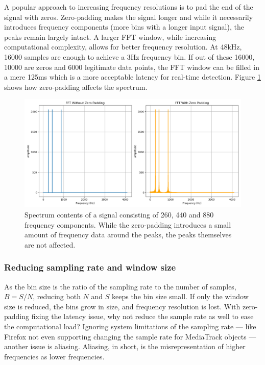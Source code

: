 A popular approach to increasing frequency resolutions is to pad the end of the signal with zeros. Zero-padding makes the signal longer and while it necessarily introduces frequency components (more bins with a longer input signal), the peaks remain largely intact. A larger FFT window, while increasing computational complexity, allows for better frequency resolution. At 48kHz, 16000 samples are enough to achieve a 3Hz frequency bin. If out of these 16000, 10000 are zeros and 6000 legitimate data points, the FFT window can be filled in a mere 125ms which is a more acceptable latency for real-time detection. Figure \ref{fig:zeropadSpectrum} shows how zero-padding affects the spectrum.

\begin{figure}[ht]
    \centering
    \includegraphics[width=\textwidth]{./images/zero_pad_spectrum.png}
    \caption{Spectrum contents of a signal consisting of 260, 440 and 880 frequency components. While the zero-padding introduces a small amount of frequency data around the peaks, the peaks themselves are not affected. \label{fig:zeropadSpectrum}}
\end{figure}

\subsubsection{Reducing sampling rate and window size}
As the bin size is the ratio of the sampling rate to the number of samples, $B = S/N$, reducing both $N$ and $S$ keeps the bin size small. If only the window size is reduced, the bins grow in size, and frequency resolution is lost. With zero-padding fixing the latency issue, why not reduce the sample rate as well to ease the computational load? Ignoring system limitations of the sampling rate — like Firefox not even supporting changing the sample rate for MediaTrack objects — another issue is aliasing. Aliasing, in short, is the misrepresentation of higher frequencies as lower frequencies. 


